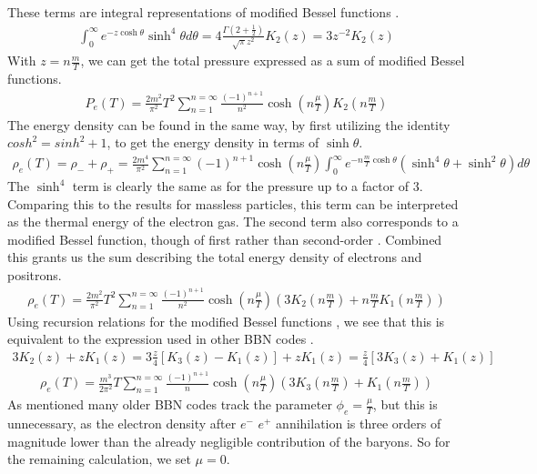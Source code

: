 These terms are integral representations of modified Bessel functions \cite[\href{https://dlmf.nist.gov/10.32.E8}{(10.32.8)}]{NIST:DLMF}.
\begin{align}
    \int_{0}^{\infty}e^{-z\cosh\theta}\sinh^4 \theta d\theta=4\frac{\Gamma(2+\frac{1}{2})}{\sqrt{\pi}z^2}K_2\left(z\right)=3z^{-2}K_2\left(z\right)
\end{align}
With $z=n\frac{m }{T}$, we can get the total pressure expressed as a sum of modified Bessel functions.
\begin{align}
    P_e(T)=\frac{2m^2}{\pi^2} T^2 \sum_{n=1}^{n=\infty} \frac{(-1)^{n+1}}{n^{2}} \cosh{\left(n\frac{\mu}{T}\right)}   K_2\left(n\frac{m }{T}\right)
    \label{eq:Pelectron}
\end{align}
The energy density can be found in the same way, by first utilizing the identity $cosh^2=sinh^2+1$, to get the energy density in terms of $\sinh\theta$.
\begin{align}
    \rho_e(T)=\rho_-+\rho_+=\frac{2m^4}{\pi^2}\sum_{n=1}^{n=\infty} (-1)^{n+1} \cosh{\left(n\frac{\mu}{T}\right)}  \int_{0}^{\infty}e^{-n\frac{m }{T}\cosh\theta}\left(\sinh^4\theta +\sinh^2\theta\right) d\theta
\end{align}
The $\sinh^4$ term is clearly the same as for the pressure up to a factor of 3. Comparing this to the results for massless particles, this term can be interpreted as the thermal energy of the electron gas. The second term also corresponds to a modified Bessel function, though of first rather than second-order \cite[\href{https://dlmf.nist.gov/10.32.E8}{(10.32.8)}]{NIST:DLMF}. Combined this grants us the sum describing the total energy density of electrons and positrons.
\begin{align}
    \rho_e(T)=\frac{2m^2}{\pi^2} T^2 \sum_{n=1}^{n=\infty} \frac{(-1)^{n+1}}{n^{2}} \cosh{\left(n\frac{\mu}{T}\right)}  \left( 3 K_2\left(n\frac{m }{T}\right) + n\frac{m }{T} K_1\left(n\frac{m }{T}\right) \right)
    \label{eq:rhoelectron}
\end{align}
Using recursion relations for the modified Bessel functions \cite[\href{https://dlmf.nist.gov/10.29.E1}{(10.29.1)}]{NIST:DLMF}, we see that this is equivalent to the expression used in other BBN codes \cite{Kawano}.
\begin{align}
3K_{2}(z)+z K_{1}(z)=3\frac{z}{4}[K_{3}(z)-K_{1}(z)]+z K_{1}(z)=\frac{z}{4}[3K_{3}(z)+K_{1}(z)]
\end{align}
\begin{align}
    \rho_e(T)=\frac{m^3}{2\pi^2} T \sum_{n=1}^{n=\infty} \frac{(-1)^{n+1}}{n} \cosh{\left(n\frac{\mu}{T}\right)}  \left( 3 K_3\left(n\frac{m }{T}\right) + K_1\left(n\frac{m }{T}\right) \right)
\end{align}
As mentioned many older BBN codes track the parameter $\phi_e=\frac{\mu}{T}$, but this is unnecessary, as the electron density after $e^-$ $e^+$ annihilation is three orders of magnitude lower than the already negligible contribution of the baryons. So for the remaining calculation, we set $\mu = 0$.

